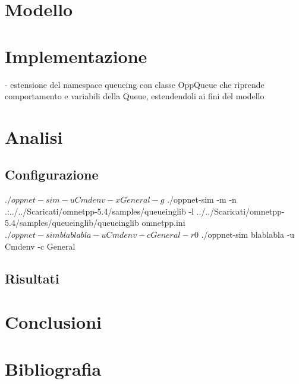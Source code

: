 \documentclass[a4paper,11pt]{article}
\begin{document}
\section{Modello}
\section{Implementazione}
- estensione del namespace queueing con classe OppQueue che riprende comportamento e variabili
della Queue, estendendoli ai fini del modello

\section{Analisi}
\subsection{Configurazione}


$ ./oppnet-sim -u Cmdenv -x General -g
$ ./oppnet-sim -m -n .:../../Scaricati/omnetpp-5.4/samples/queueinglib -l ../../Scaricati/omnetpp-5.4/samples/queueinglib/queueinglib omnetpp.ini
$ ./oppnet-sim blablabla -u Cmdenv -c General -r 0
$ ./oppnet-sim blablabla -u Cmdenv -c General %

\subsection{Risultati}

\section{Conclusioni}

\section{Bibliografia}
\end{document}
